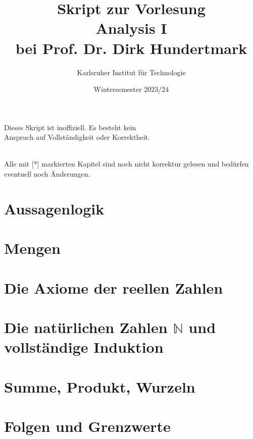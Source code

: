 \documentclass[11pt, twoside, a4paper]{article}
\theoremstyle{plain}
\newcommand{\N}{\mathbb{N}}
\begin{document}
    \title{\vspace{3cm} Skript zur Vorlesung\\Analysis I\\bei Prof. Dr. Dirk Hundertmark}
    \author{Karlsruher Institut für Technologie}
    \date{Wintersemester 2023/24}
    \maketitle
    \begin{center}
        Dieses Skript ist inoffiziell. Es besteht kein\\ Anspruch auf Vollständigkeit oder Korrektheit.
    \end{center}
    \thispagestyle{empty}
    \newpage

    \tableofcontents
    ~\\
    Alle mit [*] markierten Kapitel sind noch nicht korrektur gelesen und bedürfen eventuell noch Änderungen.
    \newpage


    \section{Aussagenlogik}
    


    \section{Mengen}
    


    \section{Die Axiome der reellen Zahlen}
    


    \section{Die natürlichen Zahlen $\N$ und vollständige Induktion}
    


    \section{Summe, Produkt, Wurzeln}
    


    \section{Folgen und Grenzwerte}
    
\end{document}

